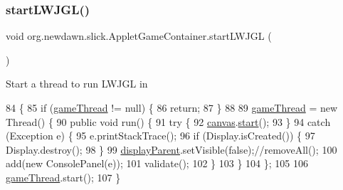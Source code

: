 \subsubsection{\texorpdfstring{start\+L\+W\+J\+G\+L()}{startLWJGL()}}
{\footnotesize\ttfamily void org.\+newdawn.\+slick.\+Applet\+Game\+Container.\+start\+L\+W\+J\+GL (\begin{DoxyParamCaption}{ }\end{DoxyParamCaption})\hspace{0.3cm}{\ttfamily [inline]}}

Start a thread to run L\+W\+J\+GL in 
\begin{DoxyCode}
84                             \{
85       \textcolor{keywordflow}{if} (\mbox{\hyperlink{classorg_1_1newdawn_1_1slick_1_1_applet_game_container_a490e718a0298d5f4731c117197fb36d0}{gameThread}} != null) \{
86          \textcolor{keywordflow}{return};
87       \}
88       
89       \mbox{\hyperlink{classorg_1_1newdawn_1_1slick_1_1_applet_game_container_a490e718a0298d5f4731c117197fb36d0}{gameThread}} = \textcolor{keyword}{new} Thread() \{
90          \textcolor{keyword}{public} \textcolor{keywordtype}{void} run() \{
91             \textcolor{keywordflow}{try} \{
92                \mbox{\hyperlink{classorg_1_1newdawn_1_1slick_1_1_applet_game_container_acf26307e20e497f0fbdabbb5110ab852}{canvas}}.\mbox{\hyperlink{classorg_1_1newdawn_1_1slick_1_1_applet_game_container_1_1_container_panel_af7a71499be1ee871ac8ec833a3cbec90}{start}}();
93             \}
94             \textcolor{keywordflow}{catch} (Exception e) \{
95                e.printStackTrace();
96                \textcolor{keywordflow}{if} (Display.isCreated()) \{
97                   Display.destroy();
98                \}
99                \mbox{\hyperlink{classorg_1_1newdawn_1_1slick_1_1_applet_game_container_a62b5a90dcfc53b23717ea63133f86332}{displayParent}}.setVisible(\textcolor{keyword}{false});\textcolor{comment}{//removeAll();}
100                add(\textcolor{keyword}{new} ConsolePanel(e));
101                validate();
102             \}
103          \}
104       \};
105       
106       \mbox{\hyperlink{classorg_1_1newdawn_1_1slick_1_1_applet_game_container_a490e718a0298d5f4731c117197fb36d0}{gameThread}}.start();
107    \}
\end{DoxyCode}
\mbox{\label{classorg_1_1newdawn_1_1slick_1_1_applet_game_container_ad376fb700e65999dafc33171e4334560}} 
